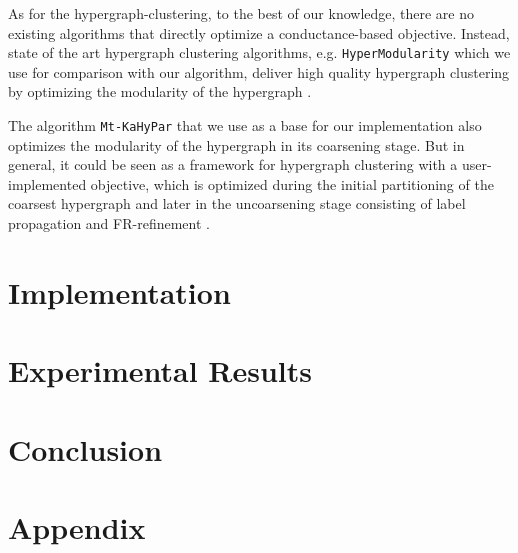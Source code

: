 \documentclass[acmsmall,nonacm,screen,review]{acmart}
\begin{document}
As for the hypergraph-clustering, to the best of our knowledge, there are no
existing algorithms that directly optimize a conductance-based objective. Instead,
state of the art hypergraph clustering algorithms, e.g. \texttt{HyperModularity} 
which we use for comparison with our algorithm, deliver high quality
hypergraph clustering by optimizing the modularity of the hypergraph
\cite{HyperModularity,ModularityComparison}.

The algorithm \texttt{Mt-KaHyPar} that we use as a base for our implementation also 
optimizes the modularity of the hypergraph in its coarsening stage. But in general,
it could be seen as a framework for hypergraph clustering with a user-implemented
objective, which is optimized during the initial partitioning of the coarsest hypergraph
and later in the uncoarsening stage consisting of label propagation and FR-refinement 
\cite{MtKaHyPar2020}.

\section{Implementation}
\label{sec:implementation}

\section{Experimental Results}
\label{sec:experiments}

\section{Conclusion}
\label{sec:conclusion}

\appendix
\section{Appendix}
\label{appendix:a}
\end{document}
